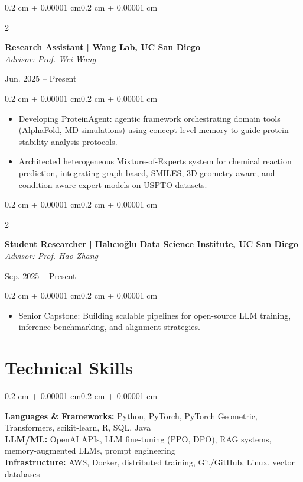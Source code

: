 \documentclass[10pt, letterpaper]{article}
\newenvironment{highlights}{
    \begin{itemize}[
        topsep=0.08 cm,
        parsep=0.08 cm,
        partopsep=0pt,
        itemsep=0pt,
        leftmargin=0.4 cm + 10pt
    ]
}{\end{itemize}}
\newenvironment{onecolentry}{
    \begin{adjustwidth}{0.2 cm + 0.00001 cm}{0.2 cm + 0.00001 cm}
}{\end{adjustwidth}}
\newenvironment{twocolentry}[2][]{
    \onecolentry
    \def\secondColumn{#2}
    \setcolumnwidth{\fill, 4.5 cm}
    \begin{paracol}{2}
}{
    \switchcolumn \raggedleft \secondColumn
    \end{paracol}
    \endonecolentry
}
\begin{document}
    \begin{twocolentry}{Jun. 2025 -- Present}
        \textbf{Research Assistant | Wang Lab, UC San Diego}\\
        \textit{Advisor: Prof. Wei Wang}
    \end{twocolentry}
    \vspace{0.08 cm}
    \begin{onecolentry}
        \begin{highlights}
            \item Developing ProteinAgent: agentic framework orchestrating domain tools (AlphaFold, MD simulations) using concept-level memory to guide protein stability analysis protocols.
            \item Architected heterogeneous Mixture-of-Experts system for chemical reaction prediction, integrating graph-based, SMILES, 3D geometry-aware, and condition-aware expert models on USPTO datasets.
        \end{highlights}
    \end{onecolentry}
    \vspace{0.15 cm}

    \begin{twocolentry}{Sep. 2025 -- Present}
        \textbf{Student Researcher | Halıcıo\u{g}lu Data Science Institute, UC San Diego}\\
        \textit{Advisor: Prof. Hao Zhang}
    \end{twocolentry}
    \vspace{0.08 cm}
    \begin{onecolentry}
        \begin{highlights}
            \item Senior Capstone: Building scalable pipelines for open-source LLM training, inference benchmarking, and alignment strategies.
        \end{highlights}
    \end{onecolentry}

    \section{Technical Skills}

    \begin{onecolentry}
        \textbf{Languages \& Frameworks:} Python, PyTorch, PyTorch Geometric, Transformers, scikit-learn, R, SQL, Java\\[2pt]
        \textbf{LLM/ML:} OpenAI APIs, LLM fine-tuning (PPO, DPO), RAG systems, memory-augmented LLMs, prompt engineering\\[2pt]
        \textbf{Infrastructure:} AWS, Docker, distributed training, Git/GitHub, Linux, vector databases
    \end{onecolentry}
\end{document}
